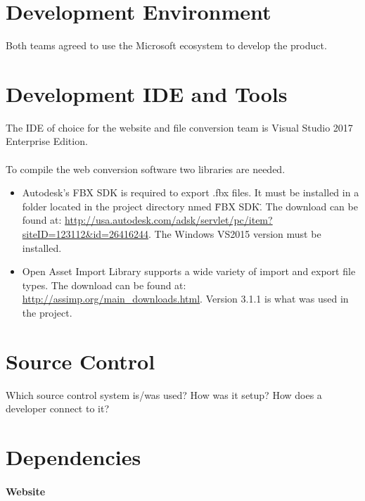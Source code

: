 \section{Development Environment}
Both teams agreed to use the Microsoft ecosystem to develop the product.

\section{Development IDE and Tools}

The IDE of choice for the website and file conversion team is Visual Studio 2017 Enterprise Edition.

\paragraph{}
To compile the web conversion software two libraries are needed.
\begin{itemize}
    \item Autodesk's FBX SDK is required to export .fbx files.  It must be installed in a folder located in the project directory nmed \"FBX SDK\".  The download can be found at: 
    \url{http://usa.autodesk.com/adsk/servlet/pc/item?siteID=123112&id=26416244}.
    The Windows VS2015 version must be installed.
    
    \item Open Asset Import Library supports a wide variety of import and export file types.  The download can be found at: \url{http://assimp.org/main_downloads.html}.  Version 3.1.1 is what was used in the project. 
\end{itemize}

\section{Source  Control}
Which source control system is/was used?  How was it setup?  How does a developer 
connect to it? 

\section{Dependencies}
\paragraph{Website}

